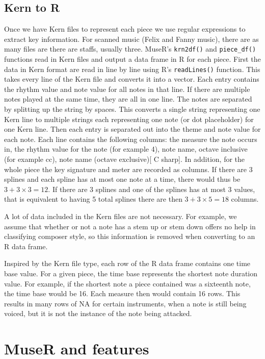\documentclass[12pt,twoside]{reedthesis}
\theoremstyle{definition}
\theoremstyle{definition}
\theoremstyle{definition}
\theoremstyle{remark}
\begin{document}
\section{Kern to R}\label{kern-to-r}

Once we have Kern files to represent each piece we use regular
expressions to extract key information. For scanned music (Felix and
Fanny music), there are as many files are there are staffs, usually
three. MuseR's \texttt{krn2df()} and \texttt{piece\_df()} functions read
in Kern files and output a data frame in R for each piece. First the
data in Kern format are read in line by line using R's
\texttt{readLines()} function. This takes every line of the Kern file
and converts it into a vector. Each entry contains the rhythm value and
note value for all notes in that line. If there are multiple notes
played at the same time, they are all in one line. The notes are
separated by splitting up the string by spaces. This converts a single
string representing one Kern line to multiple strings each representing
one note (or dot placeholder) for one Kern line. Then each entry is
separated out into the theme and note value for each note. Each line
contains the following columns: the measure the note occurs in, the
rhythm value for the note (for example 4), note name, octave inclusive
(for example cc), note name (octave exclusive){[} C sharp{]}. In
addition, for the whole piece the key signature and meter are recorded
as columns. If there are 3 splines and each spline has at most one note
at a time, there would thus be \(3 + 3\times3=12\). If there are 3
splines and one of the splines has at most 3 values, that is equivalent
to having 5 total splines there are then \(3+3\times5 = 18\) columns.

A lot of data included in the Kern files are not necessary. For example,
we assume that whether or not a note has a stem up or stem down offers
no help in classifying composer style, so this information is removed
when converting to an R data frame.

Inspired by the Kern file type, each row of the R data frame contains
one time base value. For a given piece, the time base represents the
shortest note duration value. For example, if the shortest note a piece
contained was a sixteenth note, the time base would be 16. Each measure
then would contain 16 rows. This results in many rows of NA for certain
instruments, when a note is still being voiced, but it is not the
instance of the note being attacked.

\chapter{MuseR and features}\label{muser-and-features}
\end{document}
